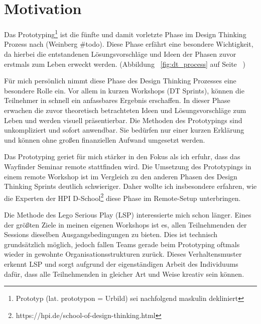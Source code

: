 \section{Motivation}

Das Prototyping\footnote{Prototyp (lat. prototypon = Urbild) sei nachfolgend maskulin dekliniert} ist die fünfte und damit vorletzte Phase im Design Thinking Prozess nach (Weinberg \#todo). Diese Phase erfährt eine besondere Wichtigkeit, da hierbei die entstandenen Lösungsvorschläge und Ideen der Phasen zuvor erstmals zum Leben erweckt werden. (Abbildung ~\ref{fig:dt_process} auf Seite ~\pageref{fig:dt_process})

Für mich persönlich nimmt diese Phase des Design Thinking Prozesses eine besondere Rolle ein. Vor allem in kurzen Workshops (DT Sprints), können die Teilnehmer in schnell ein anfassbares Ergebnis erschaffen. In dieser Phase erwachen die zuvor theoretisch betrachteten Ideen und Lösungsvorschläge zum Leben und werden visuell präsentierbar. Die Methoden des Prototypings sind unkompliziert und sofort anwendbar. Sie bedürfen nur einer kurzen Erklärung und können ohne großen finanziellen Aufwand umgesetzt werden.

Das Prototyping geriet für mich stärker in den Fokus als ich erfuhr, dass das Wayfinder Seminar remote stattfinden wird. Die Umsetzung des Prototypings in einem remote Workshop ist im Vergleich zu den anderen Phasen des Design Thinking Sprints deutlich schwieriger. Daher wollte ich insbesondere erfahren, wie die Experten der HPI D-School\footnote{https://hpi.de/school-of-design-thinking.html} diese Phase im Remote-Setup unterbringen. 

Die Methode des Lego Serious Play (LSP) interessierte mich schon länger. Eines der größten Ziele in meinen eigenen Workshops ist es, allen Teilnehmenden der Sessions dieselben Ausgangsbedingungen zu bieten. Dies ist technisch grundsätzlich möglich, jedoch fallen Teams gerade beim Prototyping oftmals wieder in gewohnte Organisationsstrukturen zurück. Dieses Verhaltensmuster erkennt LSP und sorgt aufgrund der eigenständigen Arbeit des Individuums dafür, dass alle Teilnehmenden in gleicher Art und Weise kreativ sein können.
